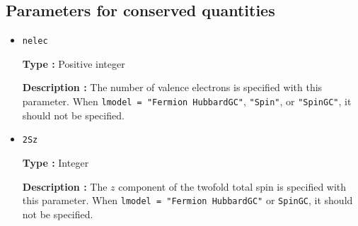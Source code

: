 \subsection{Parameters for conserved quantities}

\begin{itemize}
\item \verb|nelec|

{\bf Type :} Positive integer

{\bf Description :} The number of valence electrons is specified with this parameter.
When \verb|lmodel = "Fermion HubbardGC"|, \verb|"Spin"|, or  \verb|"SpinGC"|, 
it should not be specified.

\item \verb|2Sz|

{\bf Type :} Integer

{\bf Description :} The $z$ component of the twofold total spin is 
specified with this parameter.
When \verb|lmodel = "Fermion HubbardGC"| or \verb|SpinGC|,
it should not be specified. 
\end{itemize}

